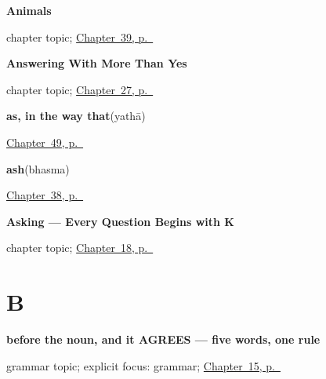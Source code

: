 \noindent\begin{minipage}[t]{\linewidth}
\raggedright
\textbf{Animals}\par
\footnotesize chapter topic; \hyperref[ch:sa-animals]{Chapter~39, p.~\pageref*{ch:sa-animals}}
\end{minipage}\par\smallskip

\noindent\begin{minipage}[t]{\linewidth}
\raggedright
\textbf{Answering With More Than Yes}\par
\footnotesize chapter topic; \hyperref[ch:sa-replies]{Chapter~27, p.~\pageref*{ch:sa-replies}}
\end{minipage}\par\smallskip

\noindent\begin{minipage}[t]{\linewidth}
\raggedright
\textbf{as, in the way that}\enspace\emph{}\enspace(yathā)\par
\footnotesize \hyperref[ch:sa-small-answers]{Chapter~49, p.~\pageref*{ch:sa-small-answers}}
\end{minipage}\par\smallskip

\noindent\begin{minipage}[t]{\linewidth}
\raggedright
\textbf{ash}\enspace\emph{}\enspace(bhasma)\par
\footnotesize \hyperref[ch:sa-fire-and-stone]{Chapter~38, p.~\pageref*{ch:sa-fire-and-stone}}
\end{minipage}\par\smallskip

\noindent\begin{minipage}[t]{\linewidth}
\raggedright
\textbf{Asking --- Every Question Begins with K}\par
\footnotesize chapter topic; \hyperref[ch:sa-asking]{Chapter~18, p.~\pageref*{ch:sa-asking}}
\end{minipage}\par\smallskip

\section*{B}

\noindent\begin{minipage}[t]{\linewidth}
\raggedright
\textbf{before the noun, and it AGREES — five words, one rule}\par
\footnotesize grammar topic; explicit focus: grammar; \hyperref[ch:sa-describing-things]{Chapter~15, p.~\pageref*{ch:sa-describing-things}}
\end{minipage}\par\smallskip

